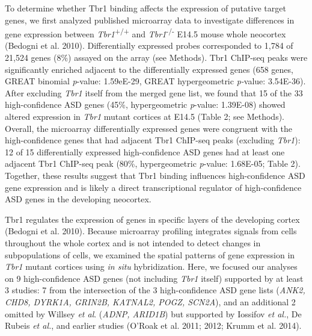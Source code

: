\documentclass[]{article}
\begin{document}
To determine whether Tbr1 binding affects the expression of putative
target genes, we first analyzed published microarray data to investigate
differences in gene expression between \emph{Tbr1}\textsuperscript{+/+}
and \emph{Tbr1}\textsuperscript{-/-} E14.5 mouse whole neocortex
(Bedogni et al. 2010). Differentially expressed probes corresponded to
1,784 of 21,524 genes (8\%) assayed on the array (see Methods). Tbr1
ChIP-seq peaks were significantly enriched adjacent to the
differentially expressed genes (658 genes, GREAT binomial
\emph{p}-value: 1.59eE-29, GREAT hypergeometric \emph{p-}value:
3.54E-36). After excluding \emph{Tbr1} itself from the merged gene list,
we found that 15 of the 33 high-confidence ASD genes (45\%,
hypergeometric \emph{p}-value: 1.39E-08) showed altered expression in
\emph{Tbr1} mutant cortices at E14.5 (Table 2; see Methods). Overall,
the microarray differentially expressed genes were congruent with the
high-confidence genes that had adjacent Tbr1 ChIP-seq peaks (excluding
\emph{Tbr1}): 12 of 15 differentially expressed high-confidence ASD
genes had at least one adjacent Tbr1 ChIP-seq peak (80\%, hypergeometric
\emph{p}-value: 1.68E-05; Table 2). Together, these results suggest that
Tbr1 binding influences high-confidence ASD gene expression and is
likely a direct transcriptional regulator of high-confidence ASD genes
in the developing neocortex.

Tbr1 regulates the expression of genes in specific layers of the
developing cortex (Bedogni et al. 2010). Because microarray profiling
integrates signals from cells throughout the whole cortex and is not
intended to detect changes in subpopulations of cells, we examined the
spatial patterns of gene expression in \emph{Tbr1} mutant cortices using
\emph{in situ} hybridization. Here, we focused our analyses on 9
high-confidence ASD genes (not including \emph{Tbr1} itself) supported
by at least 3 studies: 7 from the intersection of the 3 high-confidence
ASD gene lists (\emph{ANK2, CHD8, DYRK1A, GRIN2B, KATNAL2, POGZ,
SCN2A}), and an additional 2 omitted by Willsey \emph{et al}.
(\emph{ADNP, ARID1B}) but supported by Iossifov \emph{et al.}, De Rubeis
\emph{et al.}, and earlier studies (O'Roak et al. 2011; 2012; Krumm et
al. 2014).
\end{document}
